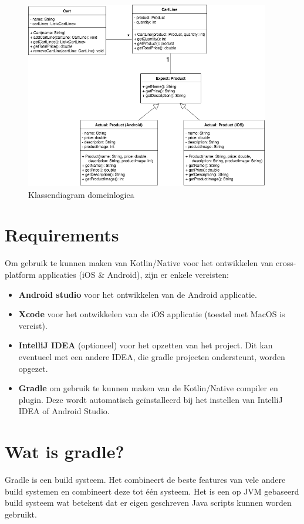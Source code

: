 \begin{figure} [ht]
	\centering
	\includegraphics[width=0.95\textwidth]{img/domeinmodel.png}
	\caption{Klassendiagram domeinlogica}
	\label{fig:domeinmodel-kn}
\end{figure}

\section{Requirements}
Om gebruik te kunnen maken van Kotlin/Native voor het ontwikkelen van cross-platform applicaties (iOS \& Android), zijn er enkele vereisten:
\begin{itemize}
	\item \textbf{Android studio} voor het ontwikkelen van de Android applicatie.
	\item \textbf{Xcode} voor het ontwikkelen van de iOS applicatie (toestel met MacOS is vereist).
	\item \textbf{IntelliJ IDEA} (optioneel) voor het opzetten van het project. Dit kan eventueel met een andere IDEA, die gradle projecten ondersteunt, worden opgezet.
	\item \textbf{Gradle} om gebruik te kunnen maken van de Kotlin/Native compiler en plugin. Deze wordt automatisch geïnstalleerd bij het instellen van IntelliJ IDEA of Android Studio.
\end{itemize}

\section{Wat is gradle?}
Gradle is een build systeem. Het combineert de beste features van vele andere build systemen en combineert deze tot één systeem. Het is een op JVM gebaseerd build systeem wat betekent dat er eigen geschreven Java scripts kunnen worden gebruikt. 

